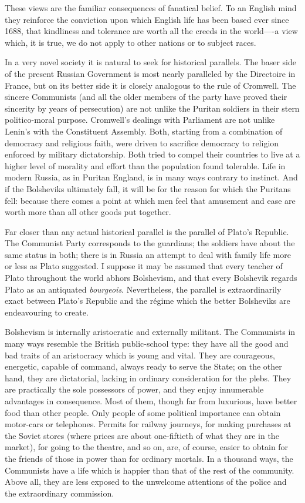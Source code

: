 These views are the familiar consequences of fanatical belief. To an English mind they reinforce the conviction upon which English life has been based ever since 1688, that kindliness and tolerance are worth all the creeds in the world----a view which, it is true, we do not apply to other nations or to subject races.

In a very novel society it is natural to seek for historical parallels. The baser side of the present Russian Government is most nearly paralleled by the Directoire in France, but on its better side it is closely analogous to the rule of Cromwell. The sincere Communists (and all the older members of the party have proved their sincerity by years of persecution) are not unlike the Puritan soldiers in their stern politico-moral purpose. Cromwell's dealings with Parliament are not unlike Lenin's with the Constituent Assembly. Both, starting from a combination of democracy and religious faith, were driven to sacrifice democracy to religion enforced by military dictatorship. Both tried to compel their countries to live at a higher level of morality and effort than the population found tolerable. Life in modern Russia, as in Puritan England, is in many ways contrary to instinct. And if the Bolsheviks ultimately fall, it will be for the reason for which the Puritans fell: because there comes a point at which men feel that amusement and ease are worth more than all other goods put together.

Far closer than any actual historical parallel is the parallel of Plato's Republic. The Communist Party corresponds to the guardians; the soldiers have about the same status in both; there is in Russia an attempt to deal with family life more or less as Plato suggested. I suppose it may be assumed that every teacher of Plato throughout the world abhors Bolshevism, and that every Bolshevik regards Plato as an antiquated \emph{bourgeois}. Nevertheless, the parallel is extraordinarily exact between Plato's Republic and the régime which the better Bolsheviks are endeavouring to create.

Bolshevism is internally aristocratic and externally militant. The Communists in many ways resemble the British public-school type: they have all the good and bad traits of an aristocracy which is young and vital. They are courageous, energetic, capable of command, always ready to serve the State; on the other hand, they are dictatorial, lacking in ordinary consideration for the plebs. They are practically the sole possessors of power, and they enjoy innumerable advantages in consequence. Most of them, though far from luxurious, have better food than other people. Only people of some political importance can obtain motor-cars or telephones. Permits for railway journeys, for making purchases at the Soviet stores (where prices are about one-fiftieth of what they are in the market), for going to the theatre, and so on, are, of course, easier to obtain for the friends of those in power than for ordinary mortals. In a thousand ways, the Communists have a life which is happier than that of the rest of the community. Above all, they are less exposed to the unwelcome attentions of the police and the extraordinary commission.

